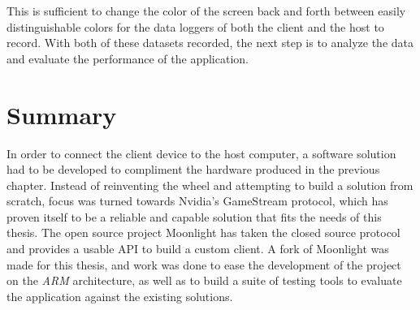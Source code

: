 This is sufficient to change the color of the screen back and forth between easily distinguishable colors for the data loggers of both the client and the host to record.
With both of these datasets recorded, the next step is to analyze the data and evaluate the performance of the application.


\section{Summary}\label{sec:SoftwareSummary}

In order to connect the client device to the host computer, a software solution had to be developed to compliment the hardware produced in the previous chapter.
Instead of reinventing the wheel and attempting to build a solution from scratch, focus was turned towards Nvidia's GameStream protocol, which has proven itself to be a reliable and capable solution that fits the needs of this thesis.
The open source project Moonlight has taken the closed source protocol and provides a usable API to build a custom client.
A fork of Moonlight was made for this thesis, and work was done to ease the development of the project on the \emph{ARM} architecture, as well as to build a suite of testing tools to evaluate the application against the existing solutions.